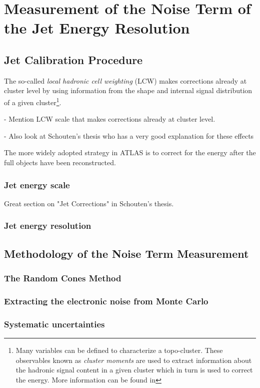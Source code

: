 \chapter{Measurement of the Noise Term of the Jet Energy Resolution}
\label{chap:calibration}

\section{Jet Calibration Procedure}
The so-called \emph{local hadronic cell weighting} (LCW) makes corrections already at cluster level by using information from the shape and internal signal distribution of a given cluster\footnote{Many variables can be defined to characterize a topo-cluster. These observables known as \emph{cluster moments} are used to extract information about the hadronic signal content in a given cluster which in turn is used to correct the energy. More information can be found in }.

- Mention LCW scale that makes corrections already at cluster level.

- Also look at Schouten's thesis who has a very good explanation for these effects

The more widely adopted strategy in ATLAS is to correct for the energy after the full objects have been reconstructed.




\subsection{Jet energy scale}
Great section on "Jet Corrections" in Schouten's thesis.

\subsection{Jet energy resolution}
\section{Methodology of the Noise Term Measurement}
\subsection{The Random Cones Method}
\subsection{Extracting the electronic noise from Monte Carlo}
\subsection{Systematic uncertainties}
